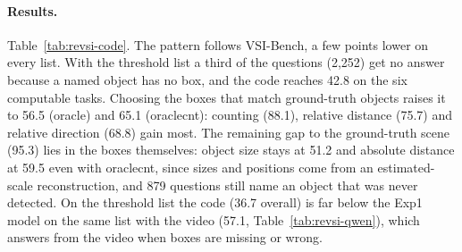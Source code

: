 \begin{table}[t]
\centering
\caption{Code solver on ReVSI (64-frame subset, 6,616 questions), no model, no video. Accuracy (multiple choice) or MRA
(numeric). ``Avg.'' is the mean over the seven tasks with route planning at 0; ``6 tasks'' leaves route planning out.
``No answer'': questions with a named object that has no box. VSI-Bench, 6 tasks: the same lists on VSI-Bench
(Table~\ref{tab:agent-code}).}
\label{tab:revsi-code}
\end{table}

\paragraph{Results.}
Table~\ref{tab:revsi-code}. The pattern follows VSI-Bench, a few points lower on every list. With the threshold list a third
of the questions (2,252) get no answer because a named object has no box, and the code reaches 42.8 on the six computable
tasks. Choosing the boxes that match ground-truth objects raises it to 56.5 (oracle) and 65.1 (oraclecnt): counting
(88.1), relative distance (75.7) and relative direction (68.8) gain most. The remaining gap to the ground-truth scene (95.3)
lies in the boxes themselves: object size stays at 51.2 and absolute distance at 59.5 even with oraclecnt, since sizes and
positions come from an estimated-scale reconstruction, and 879 questions still name an object that was never detected.
On the threshold list the code (36.7 overall) is far below the Exp1 model on the same list with the video (57.1,
Table~\ref{tab:revsi-qwen}), which answers from the video when boxes are missing or wrong.


